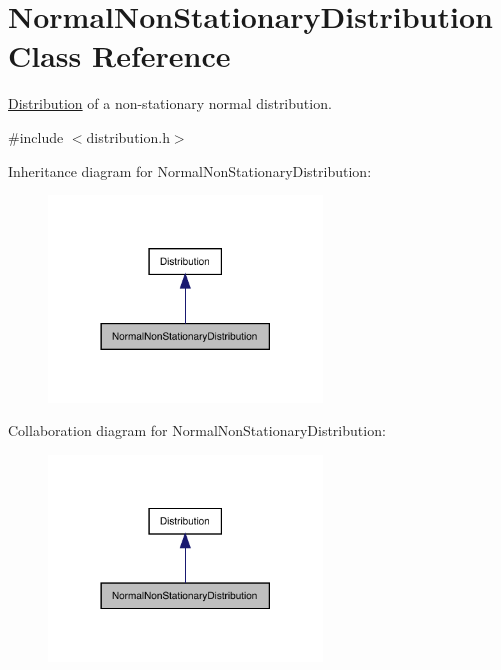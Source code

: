 \hypertarget{class_normal_non_stationary_distribution}{}\section{Normal\+Non\+Stationary\+Distribution Class Reference}
\label{class_normal_non_stationary_distribution}


\mbox{\hyperlink{class_distribution}{Distribution}} of a non-\/stationary normal distribution.  




{\ttfamily \#include $<$distribution.\+h$>$}



Inheritance diagram for Normal\+Non\+Stationary\+Distribution\+:
\nopagebreak
\begin{figure}[H]
\begin{center}
\leavevmode
\includegraphics[width=206pt]{class_normal_non_stationary_distribution__inherit__graph}
\end{center}
\end{figure}


Collaboration diagram for Normal\+Non\+Stationary\+Distribution\+:
\nopagebreak
\begin{figure}[H]
\begin{center}
\leavevmode
\includegraphics[width=206pt]{class_normal_non_stationary_distribution__coll__graph}
\end{center}
\end{figure}
